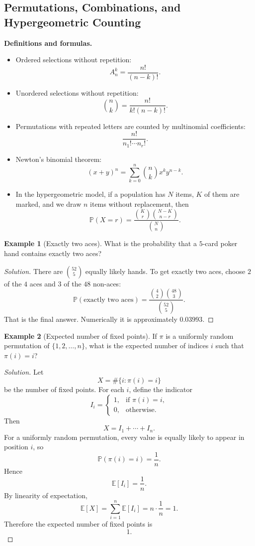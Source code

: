\documentclass[11pt]{article}
\theoremstyle{definition}
\newtheorem{example}{Example}[section]
\newcommand{\E}{\mathbb{E}}
\begin{document}
\subsection{Permutations, Combinations, and Hypergeometric Counting}
\textbf{Definitions and formulas.}
\begin{itemize}
    \item Ordered selections without repetition:
    \[
        A_n^k=\frac{n!}{(n-k)!}.
    \]
    \item Unordered selections without repetition:
    \[
        \binom{n}{k}=\frac{n!}{k!(n-k)!}.
    \]
    \item Permutations with repeated letters are counted by multinomial coefficients:
    \[
        \frac{n!}{n_1!\cdots n_r!}.
    \]
    \item Newton's binomial theorem:
    \[
        (x+y)^n=\sum_{k=0}^n \binom{n}{k}x^k y^{n-k}.
    \]
    \item In the hypergeometric model, if a population has $N$ items, $K$ of them are marked, and we draw $n$ items without replacement, then
    \[
        \mathbb{P}(X=r)=\frac{\binom{K}{r}\binom{N-K}{n-r}}{\binom{N}{n}}.
    \]
\end{itemize}

\begin{example}[Exactly two aces]
What is the probability that a $5$-card poker hand contains exactly two aces?
\end{example}

\begin{proof}[Solution]
There are $\binom{52}{5}$ equally likely hands. To get exactly two aces, choose $2$ of the $4$ aces and $3$ of the $48$ non-aces:
\[
\mathbb{P}(\text{exactly two aces}) = \frac{\binom{4}{2}\binom{48}{3}}{\binom{52}{5}}.
\]
That is the final answer. Numerically it is approximately $0.03993$.
\end{proof}

\begin{example}[Expected number of fixed points]
If $\pi$ is a uniformly random permutation of $\{1,2,\dots,n\}$, what is the expected number of indices $i$ such that $\pi(i)=i$?
\end{example}

\begin{proof}[Solution]
Let
\[
X=\#\{i: \pi(i)=i\}
\]
be the number of fixed points. For each $i$, define the indicator
\[
I_i=
\begin{cases}
1, & \text{if } \pi(i)=i,\\
0, & \text{otherwise}.
\end{cases}
\]
Then
\[
X=I_1+\cdots+I_n.
\]
For a uniformly random permutation, every value is equally likely to appear in position $i$, so
\[
\mathbb{P}(\pi(i)=i)=\frac1n.
\]
Hence
\[
\E[I_i]=\frac1n.
\]
By linearity of expectation,
\[
\E[X]=\sum_{i=1}^n \E[I_i]=n\cdot \frac1n=1.
\]
Therefore the expected number of fixed points is
\[
\boxed{1}.
\]
\end{proof}
\end{document}
